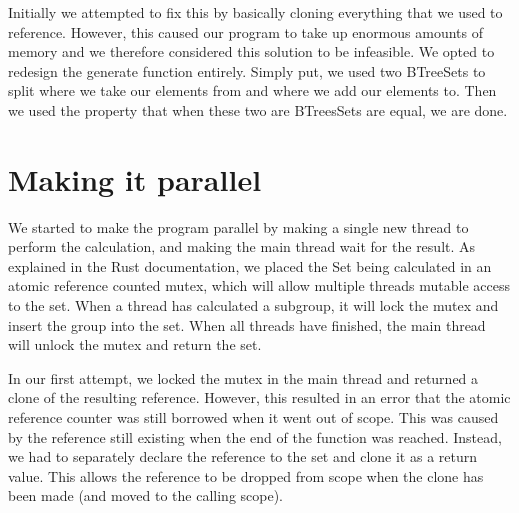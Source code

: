 \documentclass{article}
\begin{document}
Initially we attempted to fix this by basically cloning everything that we used to reference. However, this
caused our program to take up enormous amounts of memory and we therefore considered this solution to be
infeasible. We opted to redesign the generate function entirely. Simply put, we used two BTreeSets to split
where we take our elements from and where we add our elements to. Then we used the property that when these
two are BTreesSets are equal, we are done.

\section{Making it parallel}

We started to make the program parallel by making a single new thread to perform the calculation, and making the main thread wait for the result. As explained in the Rust documentation, we placed the Set being calculated in an atomic reference counted mutex, which will allow multiple threads mutable access to the set. When a thread has calculated a subgroup, it will lock the mutex and insert the group into the set. When all threads have finished, the main thread will unlock the mutex and return the set.

In our first attempt, we locked the mutex in the main thread and returned a clone of the resulting reference. However, this resulted in an error that the atomic reference counter was still borrowed when it went out of scope. This was caused by the reference still existing when the end of the function was reached. Instead, we had to separately declare the reference to the set and clone it as a return value. This allows the reference to be dropped from scope when the clone has been made (and moved to the calling scope).
\end{document}
